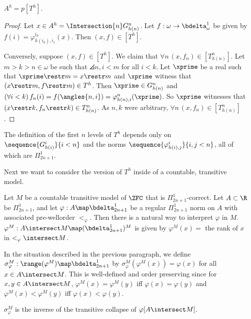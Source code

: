 \documentclass[oneside,12pt]{amsart}
\begin{document}
\begin{proposition}
$A^h = p[T^h]$.
\end{proposition}
\begin{proof}
Let $x\in A^h = \Intersection{n} G^n_{h(n)}$. Let $f:\omega\to\bdelta^1_{\omega}$
be given by $f(i)=\varphi^{i_0}_{h(i_0),i_1}(x)$. Then $(x,f)\in [T^h]$.

Conversely, suppose $(x,f)\in [T^h]$. We claim that $\forall n \, (x,f_n)\in[T^n_{h(n)}]$.
Let $m > k > n \in \omega$
be such that $\angles{n,i}<m$ for all $i<k$. Let $\xprime$ be a real
such that $\xprime\restr m = x \restr m$ and $\xprime$ witness that
$(x\restr m, f\restr m)\in T^h$. Then $\xprime\in G^n_{h(n)}$
and $(\forall i < k)\, f_n(i)=f(\angles{n,i})=\varphi^{n}_{h(n),i}(\xprime)$.
So $\xprime$ witnesses that $(x\restr k, f_n\restr k)\in T^n_{h(n)}$.
As $n,k$ were arbitrary, $\forall n \, (x,f_n)\in[T^n_{h(n)}]$.

\end{proof}


\begin{remark}
\item The definition of the first $n$ levels of $T^h$ depends only on
 $\sequence{G^i_{h(i)}}{i<n}$ and
the norms $\sequence{\varphi^i_{h(i), j}}{i,j<n}$, all of which are $\Pi^1_{2n+1}$.
\end{remark}

Next we want to consider the version of $T^h$ inside of a countable, transitive model.

Let $M$ be a countable transitive model of $\ZFC$ that is $\Pi^1_{2n+1}$-correct.
Let $A\subset\R$ be $\Pi^1_{2n+1}$, and let $\varphi:A\map\bdelta^1_{2n+1}$ be a regular
$\Pi^1_{2n+1}$ norm on $A$ with associated pre-wellorder $<_\varphi$.
Then there is a natural way to interpret $\varphi$ in $M$.
$\varphi^M:A\intersect M \map (\bdelta^1_{2n+1})^M$
is given by $\varphi^M(x) = $ the rank of $x$ in $<_\varphi \intersect M$.

\begin{definition}
In the situation described in the previous paragraph, we define
$\sigma^M_{\varphi}:\range(\varphi^M)\map\bdelta^1_{2n+1}$ by
$\sigma^M_{\varphi}(\varphi^M(x))=\varphi(x)$ for all $x\in A \intersect M$.
This is well-defined and order preserving since for $x,y\in A\intersect M$,
$\varphi^M(x)=\varphi^M(y)$ iff $\varphi(x)=\varphi(y)$ and
$\varphi^M(x)<\varphi^M(y)$ iff $\varphi(x)<\varphi(y)$.
\end{definition}

$\sigma^M_{\varphi}$ is the inverse of the transitive collapse of
$\varphi[A\intersect M]$.
\end{document}

